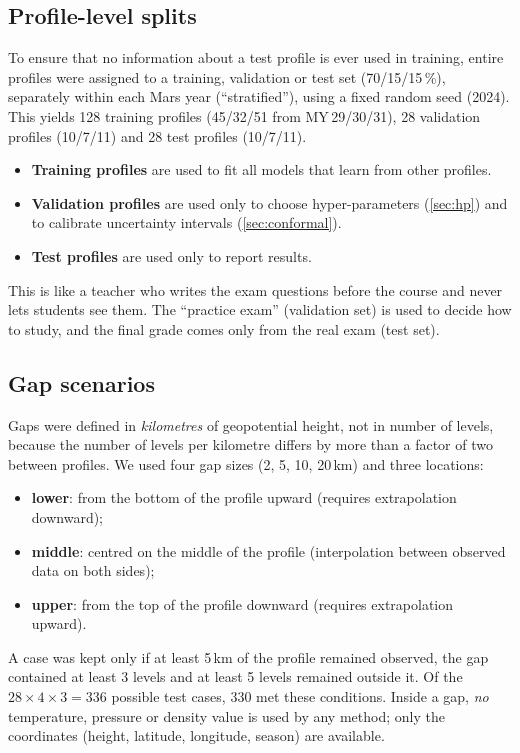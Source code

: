 \documentclass[11pt,a4paper]{article}
\begin{document}
\subsection{Profile-level splits}
To ensure that no information about a test profile is ever used in training, entire profiles were assigned to a training, validation or test set (70/15/15\,\%), separately within each Mars year (``stratified''), using a fixed random seed (2024). This yields 128 training profiles (45/32/51 from MY\,29/30/31), 28 validation profiles (10/7/11) and 28 test profiles (10/7/11).
\begin{itemize}[leftmargin=*]
\item \textbf{Training profiles} are used to fit all models that learn from other profiles.
\item \textbf{Validation profiles} are used only to choose hyper-parameters (\cref{sec:hp}) and to calibrate uncertainty intervals (\cref{sec:conformal}).
\item \textbf{Test profiles} are used only to report results.
\end{itemize}

\begin{plainbox}
This is like a teacher who writes the exam questions before the course and never lets students see them. The ``practice exam'' (validation set) is used to decide how to study, and the final grade comes only from the real exam (test set).
\end{plainbox}

\subsection{Gap scenarios}\label{sec:gaps}
Gaps were defined in \emph{kilometres} of geopotential height, not in number of levels, because the number of levels per kilometre differs by more than a factor of two between profiles. We used four gap sizes (2, 5, 10, 20\,km) and three locations:
\begin{itemize}[leftmargin=*]
\item \textbf{lower}: from the bottom of the profile upward (requires extrapolation downward);
\item \textbf{middle}: centred on the middle of the profile (interpolation between observed data on both sides);
\item \textbf{upper}: from the top of the profile downward (requires extrapolation upward).
\end{itemize}
A case was kept only if at least 5\,km of the profile remained observed, the gap contained at least 3 levels and at least 5 levels remained outside it. Of the $28\times4\times3=336$ possible test cases, 330 met these conditions. Inside a gap, \emph{no} temperature, pressure or density value is used by any method; only the coordinates (height, latitude, longitude, season) are available.
\end{document}
